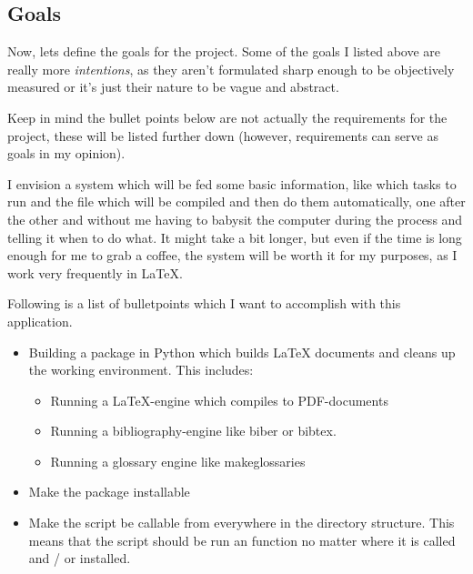 \subsection{Goals}\label{sec:goals}
Now, lets define the goals for the project. Some of the {\glqq goals\grqq} I
listed above are really more \emph{intentions}, as they aren't formulated sharp
enough to be objectively measured or it's just their nature to be vague and
abstract.

Keep in mind the bullet points below are not actually the requirements for the
project, these will be listed further down (however, requirements can serve as
goals in my opinion).

I envision a system which will be fed some basic information, like which tasks
to run and the file which will be compiled and then do them automatically, one
after the other and without me having to babysit the computer during the
process and telling it when to do what. It might take a bit longer, but even if
the time is long enough for me to grab a coffee, the system will be worth it
for my purposes, as I work very frequently in {\LaTeX}.

Following is a list of bulletpoints which I want to accomplish with this
application.

\begin{itemize}
    \item Building a package in Python which builds {\LaTeX} documents and
        cleans up the working environment. This includes:
        \begin{itemize}
            \item Running a {\LaTeX}-engine which compiles to PDF-documents
            \item Running a bibliography-engine like biber or bibtex.
            \item Running a glossary engine like makeglossaries
        \end{itemize} 
    \item Make the package installable
    \item Make the script be callable from everywhere in the directory
        structure.  This means that the script should be run an function no
        matter where it is called and / or installed.
\end{itemize}

